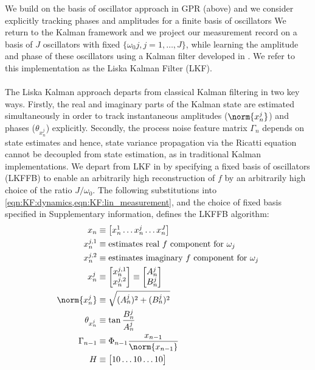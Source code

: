 We build on the basis of oscillator approach in GPR (above) and we consider explicitly tracking phases and amplitudes for a finite basis of oscillators We return to the Kalman framework and we project our measurement record on a basis of $J$ oscillators with fixed $\{ \omega_0 j, j = 1, \hdots, J \}$, while learning the amplitude and phase of these oscillators using a Kalman filter developed in \cite{livska2007}. We refer to this implementation as the Liska Kalman Filter (LKF).
\\
\\
The Liska Kalman approach departs from classical Kalman filtering in two key ways.  Firstly, the real and imaginary parts of the Kalman state are estimated simultaneously in order to track instantaneous amplitudes ($\norm{x^j_n}$) and phases ($\theta_{x^j_n}$) explicitly. Secondly, the process noise feature matrix $\Gamma_{n}$ depends on state estimates and hence, state variance propagation via the Ricatti equation cannot be decoupled from state estimation, as in traditional Kalman implementations. We depart from LKF in \cite{livska2007} by specifying a fixed basis of oscillators (LKFFB) to enable an arbitrarily high reconstruction of $f$ by an arbitrarily high choice of the ratio $J/\omega_0$. The following substitutions into \cref{eqn:KF:dynamics,eqn:KF:lin_measurement}, and the choice of fixed basis specified in Supplementary information, defines the LKFFB algorithm:
\begin{align}
x_n & \equiv \begin{bmatrix} x^{1}_{n} \hdots x^{j}_{n} \hdots x^{J}_{n} \end{bmatrix} \\
x^{j,1}_{n} & \equiv \text{estimates real $f$ component for $\omega_j$} \\
x^{j,2}_{n} & \equiv \text{estimates imaginary $f$ component for $\omega_j$} \\
x^j_n &\equiv \begin{bmatrix} x^{j,1}_{n} \\ x^{j,2}_{n} \\ \end{bmatrix} \equiv \begin{bmatrix} A^j_{n} \\ B^j_{n}  \end{bmatrix}\\
\norm{x^j_n} & \equiv \sqrt{(A^j_{n})^2 + (B^j_{n})^2} \\
\theta_{x^j_n} & \equiv \tan{\frac{B^j_{n}}{A^j_{n}}} \\
\Gamma_{n-1} &\equiv \Phi_{n-1}\frac{x_{n-1}}{\norm{x_{n-1}}}  \\
H & \equiv \begin{bmatrix} 1 0 \hdots 1 0 \hdots 1 0 \end{bmatrix}
\end{align}
